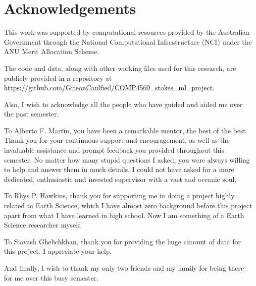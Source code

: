 \chapter*{Acknowledgements}

This work was supported by computational resources provided by the Australian Government through the National Computational Infrastructure (NCI) under the ANU Merit Allocation Scheme.

The code and data, along with other working files used for this research, are publicly provided in a repository at \url{https://github.com/GiteonCaulfied/COMP4560_stokes_ml_project}.

Also, I wish to acknowledge all the people who have guided and aided me over the past semester.

To Alberto F. Mart\'{\i}n, you have been a remarkable mentor, the best of the best. Thank you for your continuous support and encouragement, as well as the invaluable assistance and prompt feedback you provided throughout this semester. No matter how many stupid questions I asked, you were always willing to help and answer them in much details. I could not have asked for a more dedicated, enthusiastic and invested supervisor with a vast and oceanic soul.

To Rhys P. Hawkins, thank you for supporting me in doing a project highly related to Earth Science, which I have almost zero background before this project apart from what I have learned in high school. Now I am something of a Earth Science researcher myself.

To Siavash Ghelichkhan, thank you for providing the huge amount of data for this project. I appreciate your help.

And finally, I wish to thank my only two friends and my family for being there for me over this busy semester.


